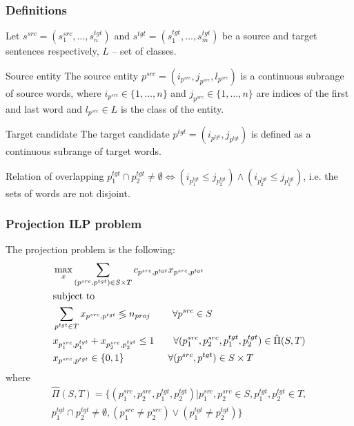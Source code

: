 \documentclass{beamer}
\newcommand{\src}[1]{#1^{src}}
\newcommand{\tgt}[1]{#1^{tgt}}
\begin{document}
\begin{frame}
  \frametitle{Definitions}

  Let \( \src{s} = \left( \src{s_1}, \dots, \tgt{s_n} \right) \) and
  \( \tgt{s} = \left( \tgt{s_1}, \dots, \tgt{s_m} \right) \) be a source and target
  sentences respectively, \( L \) -- set of classes.
  \begin{block}{Source entity}
    The source entity \( \src{p} = (i_{\src{p}}, j_{\src{p}}, l_{\src{p}} ) \) is a continuous
    subrange of source words, where \( i_{\src{p}} \in \{ 1, \dots, n \} \) and
    \( j_{\src{p}} \in \{ 1, \dots, n \} \) are indices of
    the first and last word and \( l_{\src{p}} \in L \) is the class of the entity.
  \end{block}

  \begin{block}{Target candidate}
    The target candidate \( \tgt{p} = (i_{\tgt{p}}, j_{\tgt{p}}) \) is defined as a continuous
    subrange of target words.
  \end{block}

  \begin{block}{Relation of overlapping}
    \( \tgt{p_1} \cap \tgt{p_2} \neq \emptyset \Leftrightarrow
    ( i_{\tgt{p_1}} \leq j_{\tgt{p_2}} ) \land ( i_{\tgt{p_2}} \leq j_{\tgt{p_1}} ) \),
    i.e. the sets of words are not disjoint.
  \end{block}
\end{frame}

\begin{frame}
  \frametitle{Projection ILP problem}

  The projection problem is the following:
  \begin{align*}
    & \max\limits_x \sum\limits_{(\src{p}, \tgt{p}) \in S \times T} c_{\src{p}, \tgt{p}} x_{\src{p}, \tgt{p}} \\
    & \text{subject to}                                                                                                                      \\
    & \sum\limits_{\tgt{p} \in T} x_{\src{p}, \tgt{p}} \lessgtr n_{proj}
    \; \qquad \forall \src{p} \in S \\
    & x_{\src{p_1}, \tgt{p_1}} + x_{\src{p_2}, \tgt{p_2}} \leq 1
    \qquad \forall (\src{p_1}, \src{p_2}, \tgt{p_1}, \tgt{p_2}) \in \hat{\Pi}(S, T) \\
    & x_{\src{p}, \tgt{p}} \in \{ 0, 1 \}
    \; \;\qquad \qquad \forall (\src{p}, \tgt{p}) \in S \times T \notag
  \end{align*}
  where
  \begin{align*}
    \hat{\Pi}(S, T) = \Big\{ (\src{p_1}, \src{p_2}, \tgt{p_1}, \tgt{p_2}) \Big| \src{p_1}, \src{p_2} \in S, \tgt{p_1}, \tgt{p_2} \in T, \\
      \tgt{p_1} \cap \tgt{p_2} \neq \emptyset,
    (\src{p_1} \neq \src{p_2}) \lor (\tgt{p_1} \neq \tgt{p_2}) \Big\}
  \end{align*}
\end{frame}
\end{document}
